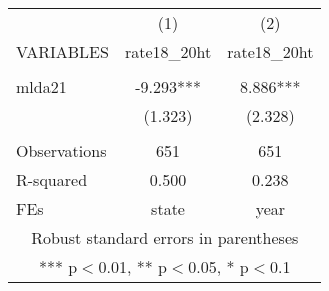 \begin{tabular}{lcc} \hline
 & (1) & (2) \\
VARIABLES & rate18\_20ht & rate18\_20ht \\ \hline
 &  &  \\
mlda21 & -9.293*** & 8.886*** \\
 & (1.323) & (2.328) \\
 &  &  \\
Observations & 651 & 651 \\
R-squared & 0.500 & 0.238 \\
 FEs & state & year \\ \hline
\multicolumn{3}{c}{ Robust standard errors in parentheses} \\
\multicolumn{3}{c}{ *** p$<$0.01, ** p$<$0.05, * p$<$0.1} \\
\end{tabular}
